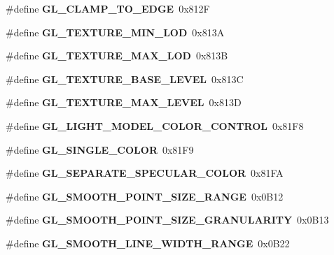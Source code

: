 \begin{DoxyCompactItemize}
\item 
\#define {\bfseries G\+L\+\_\+\+C\+L\+A\+M\+P\+\_\+\+T\+O\+\_\+\+E\+D\+G\+E}~0x812\+F\label{_s_d_l__opengl_8h_ae90f81f48642444b4ba7fa5cacf40569}

\item 
\#define {\bfseries G\+L\+\_\+\+T\+E\+X\+T\+U\+R\+E\+\_\+\+M\+I\+N\+\_\+\+L\+O\+D}~0x813\+A\label{_s_d_l__opengl_8h_ae3c158c6a713b4faa2e8616292368f36}

\item 
\#define {\bfseries G\+L\+\_\+\+T\+E\+X\+T\+U\+R\+E\+\_\+\+M\+A\+X\+\_\+\+L\+O\+D}~0x813\+B\label{_s_d_l__opengl_8h_aaa37f45604d20d8984672d908e608c5e}

\item 
\#define {\bfseries G\+L\+\_\+\+T\+E\+X\+T\+U\+R\+E\+\_\+\+B\+A\+S\+E\+\_\+\+L\+E\+V\+E\+L}~0x813\+C\label{_s_d_l__opengl_8h_a4054a5aebcfc3a6e1566802d1ecb161d}

\item 
\#define {\bfseries G\+L\+\_\+\+T\+E\+X\+T\+U\+R\+E\+\_\+\+M\+A\+X\+\_\+\+L\+E\+V\+E\+L}~0x813\+D\label{_s_d_l__opengl_8h_a48898b4f27c2e100bd856fd4ea66d774}

\item 
\#define {\bfseries G\+L\+\_\+\+L\+I\+G\+H\+T\+\_\+\+M\+O\+D\+E\+L\+\_\+\+C\+O\+L\+O\+R\+\_\+\+C\+O\+N\+T\+R\+O\+L}~0x81\+F8\label{_s_d_l__opengl_8h_ad46e3a863ebaff593693904190edbe22}

\item 
\#define {\bfseries G\+L\+\_\+\+S\+I\+N\+G\+L\+E\+\_\+\+C\+O\+L\+O\+R}~0x81\+F9\label{_s_d_l__opengl_8h_af71a33341136f2a30f241af8107e9eed}

\item 
\#define {\bfseries G\+L\+\_\+\+S\+E\+P\+A\+R\+A\+T\+E\+\_\+\+S\+P\+E\+C\+U\+L\+A\+R\+\_\+\+C\+O\+L\+O\+R}~0x81\+F\+A\label{_s_d_l__opengl_8h_ada3e23d2924780debb18fbe2f9c54fb9}

\item 
\#define {\bfseries G\+L\+\_\+\+S\+M\+O\+O\+T\+H\+\_\+\+P\+O\+I\+N\+T\+\_\+\+S\+I\+Z\+E\+\_\+\+R\+A\+N\+G\+E}~0x0\+B12\label{_s_d_l__opengl_8h_a4e846c594d59f16b86215e553fb574b6}

\item 
\#define {\bfseries G\+L\+\_\+\+S\+M\+O\+O\+T\+H\+\_\+\+P\+O\+I\+N\+T\+\_\+\+S\+I\+Z\+E\+\_\+\+G\+R\+A\+N\+U\+L\+A\+R\+I\+T\+Y}~0x0\+B13\label{_s_d_l__opengl_8h_ad452d03588a8433130ea344b22478b8f}

\item 
\#define {\bfseries G\+L\+\_\+\+S\+M\+O\+O\+T\+H\+\_\+\+L\+I\+N\+E\+\_\+\+W\+I\+D\+T\+H\+\_\+\+R\+A\+N\+G\+E}~0x0\+B22\label{_s_d_l__opengl_8h_af56abdbd62a3b09f6bf0f2d42be34443}


\end{DoxyCompactItemize}
